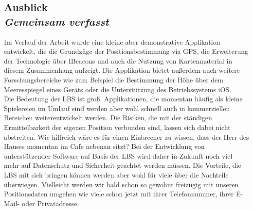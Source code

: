 \subsection[Ausblick]{Ausblick
 \\ \textnormal{\small{\textit {Gemeinsam verfasst}}}}
Im Verlauf der Arbeit wurde eine kleine aber demonstrative Applikation entwickelt, die die Grundzüge der Positionsbestimmung via GPS, die Erweiterung der Technologie über IBeacons und auch die Nutzung von Kartenmaterial in diesem Zusammenhang aufzeigt. Die Applikation bietet außerdem auch weitere Forschungsbereiche wie zum Beispiel die Bestimmung der Höhe über dem Meeresspiegel eines Geräts oder die Unterstützung des Betriebssystems iOS.
\\
Die Bedeutung der LBS ist groß. Applikationen, die momentan häufig als kleine Spielereien im Umlauf sind werden aber wohl schnell auch in kommerziellen Bereichen weiterentwickelt werden. Die Risiken, die mit der ständigen Ermittelbarkeit der eigenen Position verbunden sind, lassen sich dabei nicht abstreiten. Wie hilfreich wäre es für einen Einbrecher zu wissen, dass der Herr des Hauses momentan im Cafe nebenan sitzt? Bei der Entwicklung von unterstützender Software auf Basis der LBS wird daher in Zukunft noch viel mehr auf Datenschutz und Sicherheit geachtet werden müssen. Die Vorteile, die LBS mit sich bringen können werden aber wohl für viele über die Nachteile überwiegen. Vielleicht werden wir bald schon so gewohnt freizügig mit unseren Positionsdaten umgehen wie viele schon jetzt mit ihrer Telefonnummer, ihrer E-Mail- oder Privatadresse.